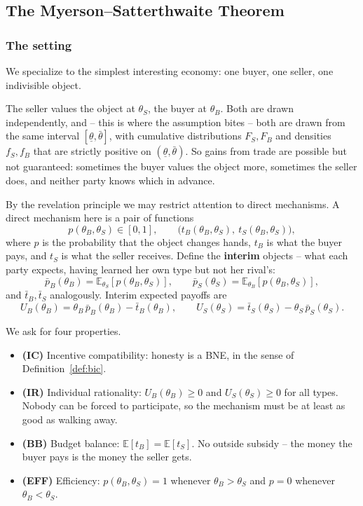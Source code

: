 \documentclass[12pt]{article}
\newcommand{\bbE}{\mathbb{E}}
\theoremstyle{definition}
\theoremstyle{remark}
\theoremstyle{plain}                          %
\newcommand{\lo}{\underline{\theta}}
\newcommand{\hi}{\bar{\theta}}
\begin{document}
\subsection{The Myerson--Satterthwaite Theorem}\label{sec:ms}
 
\subsubsection{The setting}
 
We specialize to the simplest interesting economy: one buyer, one seller, one indivisible object.
 
The seller values the object at $\theta_S$, the buyer at $\theta_B$. Both are drawn independently, and -- this is where the assumption bites -- both are drawn from the same interval $[\lo,\hi]$, with cumulative distributions $F_S, F_B$ and densities $f_S, f_B$ that are strictly positive on $(\lo,\hi)$. So gains from trade are possible but not guaranteed: sometimes the buyer values the object more, sometimes the seller does, and neither party knows which in advance.
 
By the revelation principle we may restrict attention to direct mechanisms. A direct mechanism here is a pair of functions
\[
    p(\theta_B,\theta_S) \in [0,1], \qquad
    \big(t_B(\theta_B,\theta_S),\ t_S(\theta_B,\theta_S)\big),
\]
where $p$ is the probability that the object changes hands, $t_B$ is what the buyer pays, and $t_S$ is what the seller receives. Define the \textbf{interim} objects -- what each party expects, having learned her own type but not her rival's:
\[
    \bar p_B(\theta_B) = \bbE_{\theta_S}[p(\theta_B,\theta_S)], \qquad
    \bar p_S(\theta_S) = \bbE_{\theta_B}[p(\theta_B,\theta_S)],
\]
and $\bar t_B, \bar t_S$ analogously. Interim expected payoffs are
\[
    U_B(\theta_B) = \theta_B\,\bar p_B(\theta_B) - \bar t_B(\theta_B),
    \qquad
    U_S(\theta_S) = \bar t_S(\theta_S) - \theta_S\,\bar p_S(\theta_S).
\]
 
We ask for four properties.
\begin{itemize}[nosep, topsep=3pt]
    \item \textbf{(IC)} Incentive compatibility: honesty is a BNE, in the sense of Definition~\ref{def:bic}.
    \item \textbf{(IR)} Individual rationality: $U_B(\theta_B) \ge 0$ and $U_S(\theta_S) \ge 0$ for all types. Nobody can be forced to participate, so the mechanism must be at least as good as walking away.
    \item \textbf{(BB)} Budget balance: $\bbE[t_B] = \bbE[t_S]$. No outside subsidy -- the money the buyer pays is the money the seller gets.
    \item \textbf{(EFF)} Efficiency: $p(\theta_B,\theta_S) = 1$ whenever $\theta_B > \theta_S$ and $p = 0$ whenever $\theta_B < \theta_S$.
\end{itemize}
 
\end{document}
